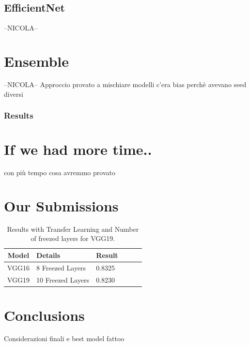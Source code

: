 \documentclass[10pt]{article}
\begin{document}
\subsection{EfficientNet}
--NICOLA--



\section{Ensemble}
--NICOLA--
Approccio
provato a mischiare modelli
          c'era bias perchè avevano seed diversi
\subsubsection{Results}



\section{If we had more time..}
con più tempo cosa avremmo provato




\section{Our Submissions}
\begin{table}[ht]
\centering
\begin{adjustbox}{width=240}
\small
\begin{tabular}{|c|l|l|l|l|l}

\hline \bf Model & \bf Details & \bf Result \\ \hline
VGG16 & 8 Freezed Layers & 0.8325 \\
VGG19 & 10 Freezed Layers & 0.8230 \\
\hline
\end{tabular}
\end{adjustbox}
\caption{Results with Transfer Learning and Number of freezed layers for VGG19.}
\end{table}
\section{Conclusions}
Considerazioni finali e best model fattoo

\end{document}
